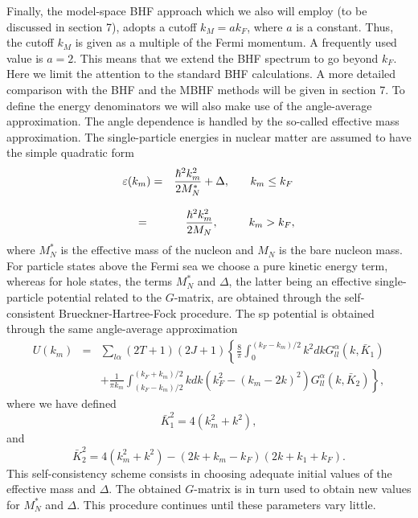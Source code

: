Finally,
the model-space BHF approach which we also will
employ (to be discussed in section 7), adopts a cutoff $k_M =  ak_F$,
where $a$ is a constant. Thus, the cutoff $k_M$ is given
as a multiple
of the Fermi momentum. A frequently used value \cite{km83}
is $a= 2$.
This means that we extend
the BHF spectrum
to go beyond $k_F$. Here we
limit the attention to the standard BHF calculations. A more detailed
comparison with the BHF and the MBHF methods will be given in
section 7.
To define the energy denominators we will also make use of the
angle-average approximation.
The angle dependence is handled by the
so-called effective mass approximation. The single-particle energies
in nuclear matter are assumed to have the simple quadratic form
\begin{equation}
   \begin{array}{ccc}
   \varepsilon (k_m)=&
   {\displaystyle\frac{\hbar^{2}k_m^2}
   {2M_{N}^{*}}}+\Delta ,&\hspace{3mm}k_m\leq k_F\\
   &&\\
   =&{\displaystyle\frac{\hbar^{2}
   k_m^2}{2M_{N}}},&\hspace{3mm}k_m> k_F ,\\
   \end{array}
   \label{eq:spen}
\end{equation}
where $M_{N}^{*}$ is the effective mass of the nucleon and $M_{N}$ is the
bare nucleon mass. For particle states above the Fermi sea we choose
a pure kinetic energy term, whereas for hole states,
the terms $M_{N}^{*}$ and $\Delta$, the latter being 
an effective single-particle
potential related to the $G$-matrix, are obtained through the
self-consistent Brueckner-Hartree-Fock procedure.
The sp potential is obtained through the same angle-average approximation
\cite{ht70}
\begin{eqnarray}
  \label{eq:Uav}
   U(k_m) & = & \sum_{l\alpha} (2T+1)(2J+1)
   \left \{ \frac{8}{\pi}\int_{0}^{(k_F-k_m)/2}
   k^2dk G_{ll}^{\alpha}(k,\bar{K}_1) \right.  \\
   &  &  \left.
    + \frac{1}{\pi k_m}\int_{(k_F-k_m)/2}^{(k_F+k_m)/2}
   kdk (k_F ^2-(k_m-2k)^2)
   G_{ll}^{\alpha}(k,\bar{K}_2)  \right \}  \nonumber,
\end{eqnarray}
where we have defined
\begin{equation}
    \bar{K}_1^2=4(k_m^2+k^2),
\end{equation}
and
\begin{equation}
    \bar{K}_2^2=4(k_m^2+k^2)-(2k+k_m-k_F)(2k+k_1+k_F).
\end{equation}
This
self-consistency scheme consists in choosing adequate initial values of the
effective mass and $\Delta$. The obtained $G$-matrix is in turn used to
obtain new values for $M_{N}^{*}$ and $\Delta$. This procedure
continues until these parameters vary little.


